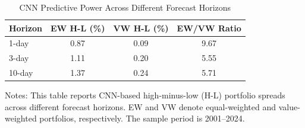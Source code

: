 
\begin{table}[htbp]
    \centering
    \caption{CNN Predictive Power Across Different Forecast Horizons}
    \label{tab:horizon_eval}
    \begin{threeparttable}
    \begin{tabular}{l
                    S[table-format=1.2]
                    S[table-format=1.2]
                    S[table-format=1.2]}
        \toprule
        {Horizon} & {EW H-L (\%)} & {VW H-L (\%)} & {EW/VW Ratio} \\
        -day & 0.87 & 0.09 & 9.67 \\
        3-day & 1.11 & 0.20 & 5.55 \\
        10-day & 1.37 & 0.24 & 5.71 \\
        \bottomrule
    \end{tabular}
    \begin{tablenotes}
        \footnotesize
        \item Notes: This table reports CNN-based high-minus-low (H-L) portfolio spreads
        across different forecast horizons. EW and VW denote equal-weighted and
        value-weighted portfolios, respectively. The sample period is 2001--2024.
    \end{tablenotes}
    \end{threeparttable}
\end{table}

%

